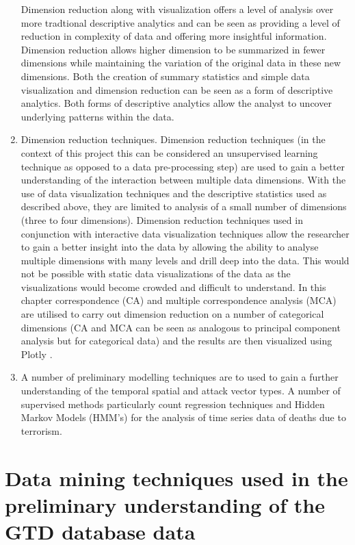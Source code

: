 \begin{enumerate}
Dimension reduction along with visualization offers a level of analysis over more tradtional descriptive analytics and can be seen as providing a level of reduction in complexity of data and offering more insightful information. Dimension reduction allows higher dimension to be summarized in fewer dimensions while maintaining the variation of the original data in these new dimensions.  Both the creation of summary statistics and simple data visualization and dimension reduction can be seen as a form of descriptive analytics. Both forms of descriptive analytics allow the analyst to uncover underlying patterns within the data.
\item Dimension reduction techniques. Dimension reduction techniques (in the context of this project this can be considered an unsupervised learning technique as opposed to a data pre-processing step) are used to gain a better understanding of the interaction between multiple data dimensions. With the use of data visualization techniques and the descriptive statistics used as described above, they are limited to analysis of a small number of dimensions (three to four dimensions). Dimension reduction techniques used in conjunction with interactive data visualization techniques  allow the researcher to gain a better insight into the data by allowing the ability to analyse multiple dimensions with many levels and drill deep into the data. This would not be possible with static data visualizations of the data as the visualizations would become crowded and difficult to understand. In this chapter correspondence (CA) and multiple correspondence analysis (MCA) \citep{factominer2008} are utilised to carry out dimension reduction on a number of categorical dimensions (CA and MCA can be seen as analogous to principal component analysis but for categorical data) and the results are then visualized using Plotly \citep{plotlymanual2016}. 
\item A number of preliminary modelling techniques are to used to gain a further understanding of the temporal spatial and attack vector types. A number of supervised methods particularly count regression techniques and Hidden Markov Models (HMM's) for the analysis of time series data of deaths due to terrorism.  
\end{enumerate}

\section{Data mining techniques used in the preliminary understanding of the GTD database data}
\label{sec:chap4dataprep}


